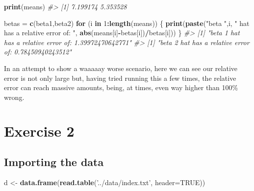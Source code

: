 \documentclass[]{article}
\newenvironment{Shaded}{\begin{snugshade}}{\end{snugshade}}
\newcommand{\CommentTok}[1]{\textcolor[rgb]{0.56,0.35,0.01}{\textit{#1}}}
\newcommand{\ControlFlowTok}[1]{\textcolor[rgb]{0.13,0.29,0.53}{\textbf{#1}}}
\newcommand{\DataTypeTok}[1]{\textcolor[rgb]{0.13,0.29,0.53}{#1}}
\newcommand{\DecValTok}[1]{\textcolor[rgb]{0.00,0.00,0.81}{#1}}
\newcommand{\KeywordTok}[1]{\textcolor[rgb]{0.13,0.29,0.53}{\textbf{#1}}}
\newcommand{\NormalTok}[1]{#1}
\newcommand{\OperatorTok}[1]{\textcolor[rgb]{0.81,0.36,0.00}{\textbf{#1}}}
\newcommand{\OtherTok}[1]{\textcolor[rgb]{0.56,0.35,0.01}{#1}}
\newcommand{\StringTok}[1]{\textcolor[rgb]{0.31,0.60,0.02}{#1}}
\begin{document}
\begin{Shaded}
\begin{Highlighting}[]
\KeywordTok{print}\NormalTok{(means)}
\CommentTok{#> [1] 7.199174 5.353528}
\end{Highlighting}
\end{Shaded}

\begin{Shaded}
\begin{Highlighting}[]
\NormalTok{betas =}\StringTok{ }\KeywordTok{c}\NormalTok{(beta1,beta2)}
\ControlFlowTok{for}\NormalTok{ (i }\ControlFlowTok{in} \DecValTok{1}\OperatorTok{:}\KeywordTok{length}\NormalTok{(means)) \{}
    \KeywordTok{print}\NormalTok{(}\KeywordTok{paste}\NormalTok{(}\StringTok{"beta "}\NormalTok{,i, }\StringTok{" hat has a relative error of: "}\NormalTok{, }\KeywordTok{abs}\NormalTok{(means[i]}\OperatorTok{-}\NormalTok{betas[i])}\OperatorTok{/}\NormalTok{betas[i]))}
\NormalTok{\}}
\CommentTok{#> [1] "beta  1  hat has a relative error of:  1.39972470642771"}
\CommentTok{#> [1] "beta  2  hat has a relative error of:  0.78450940243512"}
\end{Highlighting}
\end{Shaded}

In an attempt to show a waaaaay worse scenario, here we can see our
relative error is not only large but, having tried running this a few
times, the relative error can reach massive amounts, being, at times,
even way higher than 100\% wrong.

\newpage

\hypertarget{exercise-2}{%
\section{Exercise 2}\label{exercise-2}}

\hypertarget{importing-the-data}{%
\subsection{Importing the data}\label{importing-the-data}}

\begin{Shaded}
\begin{Highlighting}[]
\NormalTok{d <-}\StringTok{ }\KeywordTok{data.frame}\NormalTok{(}\KeywordTok{read.table}\NormalTok{(}\StringTok{'../data/index.txt'}\NormalTok{, }\DataTypeTok{header=}\OtherTok{TRUE}\NormalTok{))}
\end{Highlighting}
\end{Shaded}
\end{document}
